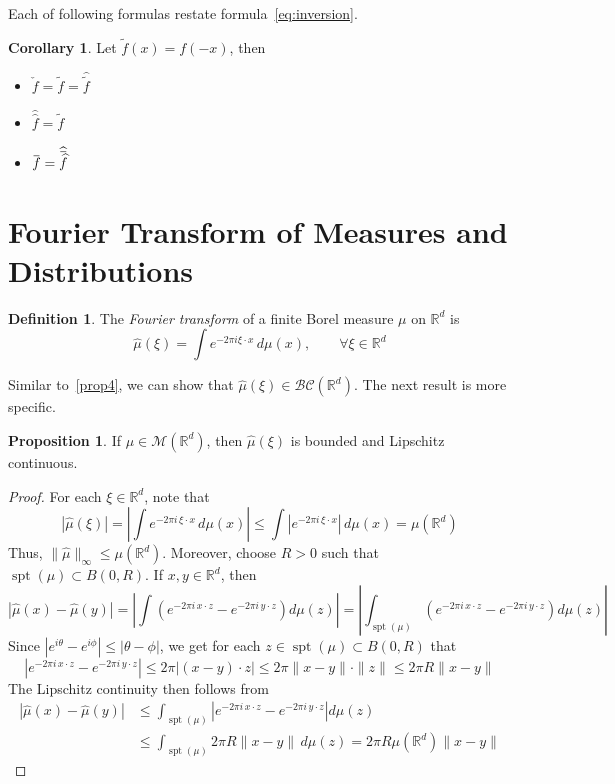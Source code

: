 \documentclass[12pt,a4paper]{report}
\newcommand{\overbar}[1]{\mkern 1.5mu\overline{\mkern-1.5mu#1\mkern-1.5mu}\mkern 1.5mu}
\theoremstyle{definition}
\newtheorem{proposition}{Proposition}
\newtheorem{definition}{Definition}
\newtheorem{corollary}{Corollary}
\begin{document}
Each of following formulas restate formula~\ref{eq:inversion}.
\begin{corollary} \label{3.9}
Let \( \tilde{f}(x) = f(-x) \), then
\begin{itemize}
    \item [a.] $\check{f} = \tilde{f} = \widehat{\tilde{f}}$
    \item [b.] $\widehat{\widehat{f}} = \tilde{f}$
    \item [c.] $\overbar{f} = \widehat{\overbar{\widehat{f}}}$
\end{itemize}

\end{corollary}

\section{Fourier Transform of Measures and Distributions}

\begin{definition}
    The \textit{Fourier transform} of a finite Borel measure $\mu$ on $\mathbb{R}^d$ is $$ \widehat{\mu}(\xi) = \int e^{-2\pi i \xi \cdot x} \, d\mu(x), \qquad \forall\xi \in \mathbb{R}^d $$
\end{definition}

Similar to~\ref{prop4}, we can show that $ \widehat{\mu}(\xi) \in \mathcal{BC}(\mathbb{R}^d)$. The next result is more specific.
\begin{proposition}
If \( \mu \in \mathcal{M}(\mathbb{R}^d) \), then $\widehat{\mu}(\xi)$ is bounded and Lipschitz continuous.
\end{proposition}

\begin{proof}
For each $\xi \in \mathbb{R}^d$, note that
$$ |\widehat{\mu}(\xi)| = \left| \int e^{-2\pi i\, \xi \cdot x} \, d\mu(x) \right|
\le \int |e^{-2\pi i\, \xi \cdot x}| \, d\mu(x) = \mu(\mathbb{R}^d) $$
Thus, $\|\widehat{\mu} \|_\infty \le \mu(\mathbb{R}^d)$. Moreover, choose $R > 0$ such that $ \operatorname{spt} (\mu) \subset B(0, R) $. If \( x, y \in \mathbb{R}^d \), then
\[
|\widehat{\mu}(x) - \widehat{\mu}(y)|
= \left| \int \left(e^{-2\pi i\, x \cdot z} - e^{-2\pi i\, y \cdot z} \right) d\mu(z) \right| = \left| \int_{\operatorname{spt}(\mu)} \left( e^{-2\pi i\, x \cdot z} - e^{-2\pi i\, y \cdot z} \right) d\mu(z) \right|
\]
Since $|e^{i\theta} - e^{i\phi}| \le |\theta - \phi|$, we get for each $z \in \operatorname{spt} (\mu) \subset B(0, R)$ that
\[
|e^{-2\pi i\, x \cdot z} - e^{-2\pi i\, y \cdot z}|
\le 2\pi |(x - y) \cdot z|
\le 2\pi \|x - y\| \cdot \|z\| \leq  2\pi R \|x - y\|
\]
The Lipschitz continuity then follows from
\begin{align*}
|\widehat{\mu}(x) - \widehat{\mu}(y)|
&\le \int_{\operatorname{spt}(\mu)} \left| e^{-2\pi i\, x \cdot z} - e^{-2\pi i\, y \cdot z} \right| d\mu(z) \\
&\le \int_{\operatorname{spt}(\mu)} 2\pi R \|x - y\| \, d\mu(z) = 2\pi R \mu(\mathbb{R}^d)\|x - y\|
\end{align*}
\end{proof}
\end{document}
